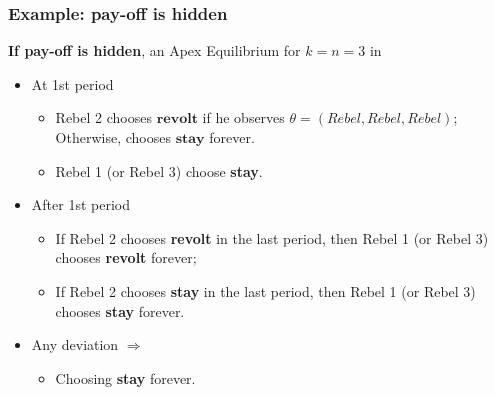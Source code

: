 \documentclass[9pt]{beamer}
\begin{document}
\begin{frame}[label=ex_hidden]
  \frametitle{Example: pay-off is hidden}

\alert{\textbf{If pay-off is hidden}}, an Apex Equilibrium for $k=n=3$ in
  \begin{center}
\end{center}

\begin{itemize}[<+->]
\item At 1st period
\begin{itemize}
\item Rebel 2 chooses $\textbf{revolt}$ if he observes $\theta=(Rebel,Rebel,Rebel)$; Otherwise, chooses $\textbf{stay}$ forever.
\item Rebel 1 (or Rebel 3) choose \textbf{stay}.
\end{itemize}

\item After 1st period
\begin{itemize}
\item If Rebel 2 chooses \textbf{revolt} in the last period, then Rebel 1 (or Rebel 3) chooses \textbf{revolt} forever; 
\item If Rebel 2 chooses \textbf{stay} in the last period, then Rebel 1 (or Rebel 3) chooses \textbf{stay} forever.
\end{itemize}
 
 \item Any deviation $\Rightarrow$
 \begin{itemize}
 \item Choosing \textbf{stay} forever.
 \end{itemize}
\end{itemize}

  
\end{frame}
\end{document}

